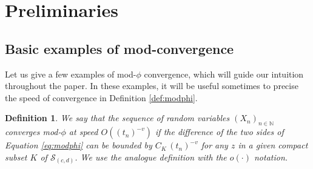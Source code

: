 \documentclass[12pt,a4paper,reqno]{amsart}
\newtheorem{definition}[lemma]{Definition}
\theoremstyle{remark}
\newcommand{\N}{\mathbb{N}}
\begin{document}
\section{Preliminaries}
\subsection{Basic examples of mod-convergence}
\label{subsec:basicexamples}
Let us give a few examples of mod-$\phi$ convergence, which will guide our intuition throughout the paper. In these examples, it will be useful sometimes to precise the speed of convergence in Definition \ref{def:modphi}.

\begin{definition}
We say that the sequence of random variables $(X_{n})_{n \in \N}$ converges mod-$\phi$ at speed $O((t_{n})^{-v})$ if the difference of the two sides of Equation \eqref{eq:modphi} can be bounded by $C_{K}\,(t_{n})^{-v}$ for any $z$ in a given compact subset $K$ of $\mathcal{S}_{(c,d)}$. We use the analogue definition with the $o(\cdot)$ notation.
\end{definition}\medskip
\end{document}
